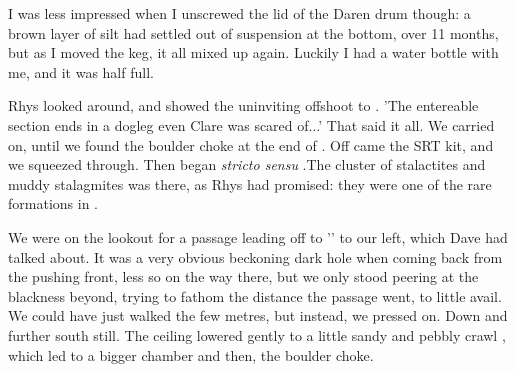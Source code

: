 I was less impressed when I unscrewed the lid of the Daren drum though: a brown layer of silt had settled out of suspension at the bottom, over 11 months, but as I moved the keg, it all mixed up again. Luckily I had a water bottle with me, and it was half full.

Rhys looked around, and showed the uninviting offshoot to . 'The entereable section ends in a dogleg even Clare was scared of...' That said it all. We carried on, until we found the boulder choke at the end of . Off came the SRT kit, and we squeezed through. 
Then began  \emph{stricto sensu} .The cluster of stalactites and muddy stalagmites was there, as Rhys had promised: they were one of the rare formations in . 

We were on the lookout for a passage leading off to '' to our left, which Dave had talked about. It was a very obvious beckoning dark hole when coming back from the pushing front, less so on the way there, but we only stood peering at the blackness beyond, trying to fathom the distance the passage went, to little avail. We could have just walked the few metres, but instead, we pressed on. Down and further south still. The ceiling lowered gently to a little sandy and pebbly crawl , which led to a bigger chamber and then, the boulder choke.

